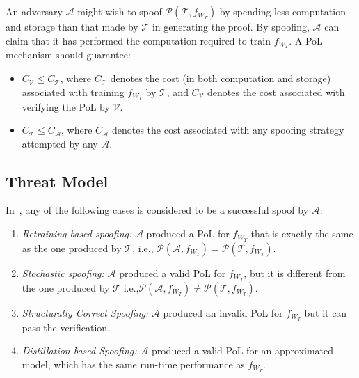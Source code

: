 \documentclass[conference]{IEEEtran}
\newcommand{\Prov}{\mathcal{T}\xspace}
\newcommand{\Verif}{\mathcal{V}\xspace}
\newcommand{\Adv}{\mathcal{A}\xspace}
\newcommand{\Proof}{\mathcal{P}\xspace}
\begin{document}
An {adversary\EndAccSupp{}} $\Adv$ might wish to {spoof\EndAccSupp{}} $\Proof(\Prov, f_{W_T})$ by spending less computation and storage than that made by $\Prov$ in generating the proof.
By spoofing, $\Adv$ can claim that it has performed the computation required to train $f_{W_T}$. 
A PoL mechanism should guarantee: 
\begin{itemize}
    \item $C_{\Verif} \leq C_{\Prov}$, where $C_{\Prov}$ {denotes\EndAccSupp{}} the cost (in both computation and storage) associated with training $f_{W_T}$ by $\Prov$, and $C_{\Verif}$ denotes the cost associated with verifying the PoL by $\Verif$. 


    \item $C_{\Prov} \leq C_{\Adv}$, where $C_{\Adv}$ denotes the cost associated with any {spoofing\EndAccSupp{}} strategy attempted by any $\Adv$.
\end{itemize}


\subsection{Threat Model}
\label{sec:model}




In~\cite{PoL}, any of the following cases is {considered\EndAccSupp{}} to be a successful {spoof\EndAccSupp{}} by $\Adv$:
\begin{enumerate}
    \item {\em Retraining-based spoofing:} $\Adv$ {produced\EndAccSupp{}} a PoL for $f_{W_T}$ that is exactly the same as the one produced by $\Prov$, i.e., $\Proof(\Adv, f_{W_T}) = \Proof(\Prov, f_{W_T})$.
    \item {\em Stochastic spoofing:} $\Adv$ produced a valid PoL for $f_{W_T}$, but it is {different\EndAccSupp{}} from the one produced by $\Prov$ i.e.,$\Proof(\Adv, f_{W_T}) \neq \Proof(\Prov, f_{W_T})$.
    \item {\em Structurally Correct Spoofing:} $\Adv$ produced an invalid PoL for $f_{W_T}$ but it can pass the verification.
    \item {\em Distillation-based Spoofing:} $\Adv$ produced a valid PoL for an {approximated\EndAccSupp{}} model, which has the same run-time performance as $f_{W_T}$.
\end{enumerate}
\end{document}
